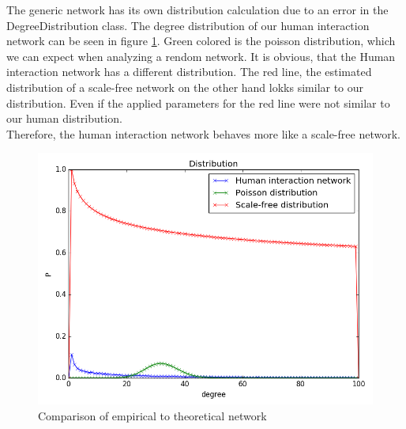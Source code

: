 \documentclass[10pt,a4paper]{article}
\begin{document}
\begin{enumerate}
The generic network has its own distribution calculation due to an error in the DegreeDistribution class. The degree distribution of our human interaction network can be seen in figure \ref{fig-distribution}. Green colored is the poisson distribution, which we can expect when analyzing a rendom network. It is obvious, that the Human interaction network has a different distribution. The red line, the estimated distribution of a scale-free network on the other hand lokks similar to our distribution. Even if the applied parameters for the red line were not similar to our human distribution.\\
Therefore, the human interaction network behaves more like a scale-free network. 

\begin{figure}
\includegraphics[scale=0.7]{Plot_distribution.png}
\caption{Comparison of empirical to theoretical network}
\label{fig-distribution}
\end{figure}



\end{enumerate}
\end{document}
